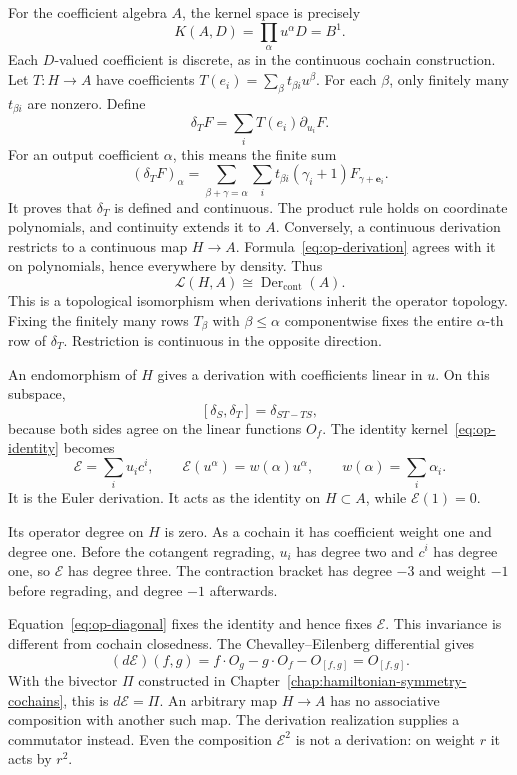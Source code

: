 For the coefficient algebra $A$, the kernel space is precisely
\[
 K(A,D)=\prod_\alpha u^\alpha D=B^1.
\]
Each $D$-valued coefficient is discrete, as in the continuous cochain
construction. Let $T:H\to A$ have coefficients
$T(e_i)=\sum_\beta t_{\beta i}u^\beta$.
For each $\beta$, only finitely many $t_{\beta i}$ are nonzero.
Define
\begin{equation}
 \delta_TF=\sum_iT(e_i)\partial_{u_i}F.
 \label{eq:op-derivation}
\end{equation}
For an output coefficient $\alpha$, this means the finite sum
\[
 (\delta_TF)_\alpha
  =\sum_{\beta+\gamma=\alpha}\sum_i
       t_{\beta i}(\gamma_i+1)F_{\gamma+\mathbf e_i}.
\]
It proves that $\delta_T$ is defined and continuous. The product rule
holds on coordinate polynomials, and continuity extends it to $A$.
Conversely, a continuous derivation restricts to a continuous map $H\to A$.
Formula~\eqref{eq:op-derivation} agrees with it on polynomials, hence
everywhere by density. Thus
\[
 \mathcal L(H,A)\cong\operatorname{Der}_{\mathrm{cont}}(A).
\]
This is a topological isomorphism when derivations inherit the operator
topology. Fixing the finitely many rows $T_\beta$ with $\beta\leq\alpha$ componentwise
fixes the entire $\alpha$-th row of $\delta_T$. Restriction is continuous
in the opposite direction.

An endomorphism of $H$ gives a derivation with coefficients linear in $u$.
On this subspace,
\[
 [\delta_S,\delta_T]=\delta_{ST-TS},
\]
because both sides agree on the linear functions $O_f$.
The identity kernel~\eqref{eq:op-identity} becomes
\[
 \mathcal E=\sum_i u_ic^i,\qquad
 \mathcal E(u^\alpha)=w(\alpha)u^\alpha,
 \qquad w(\alpha)=\sum_i\alpha_i.
\]
It is the Euler derivation. It acts as the identity on $H\subset A$,
while $\mathcal E(1)=0$.

Its operator degree on $H$ is zero. As a cochain it has coefficient
weight one and degree one. Before the cotangent regrading, $u_i$ has
degree two and $c^i$ has degree one, so $\mathcal E$ has degree three.
The contraction bracket has degree $-3$ and weight $-1$ before
regrading, and degree $-1$ afterwards.

Equation~\eqref{eq:op-diagonal} fixes the identity and hence fixes
$\mathcal E$. This invariance is different from cochain closedness.
The Chevalley--Eilenberg differential gives
\[
 (d\mathcal E)(f,g)
   =f\cdot O_g-g\cdot O_f-O_{[f,g]}=O_{[f,g]}.
\]
With the bivector $\Pi$ constructed in
Chapter~\ref{chap:hamiltonian-symmetry-cochains}, this is $d\mathcal E=\Pi$.
An arbitrary map $H\to A$ has no associative composition with another
such map. The derivation realization supplies a commutator instead.
Even the composition $\mathcal E^2$ is not a derivation: on weight $r$
it acts by $r^2$.


